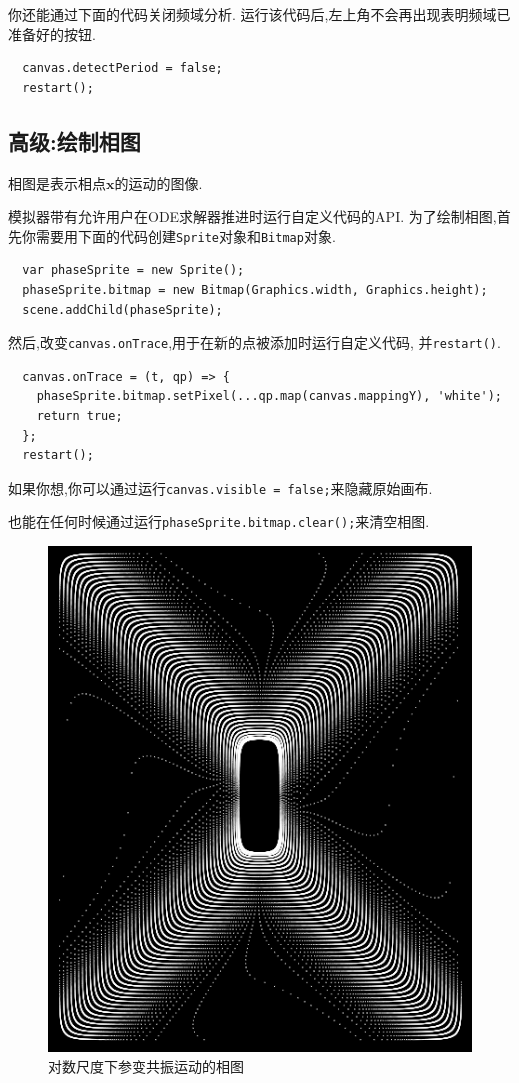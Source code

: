 \documentclass[12pt]{article}
\begin{document}
你还能通过下面的代码关闭频域分析.
运行该代码后,左上角不会再出现表明频域已准备好的按钮.

\begin{verbatim}
  canvas.detectPeriod = false;
  restart();
\end{verbatim}

\subsection{高级:绘制相图}

相图是表示相点$\mathbf x$的运动的图像\cite[p. 146]{landau1976mechanics}\cite[p. 68]{arnold1989mathmech}.

模拟器带有允许用户在ODE求解器推进时运行自定义代码的API.
为了绘制相图,首先你需要用下面的代码创建\texttt{Sprite}对象和\texttt{Bitmap}对象.

\begin{verbatim}
  var phaseSprite = new Sprite();
  phaseSprite.bitmap = new Bitmap(Graphics.width, Graphics.height);
  scene.addChild(phaseSprite);
\end{verbatim}

然后,改变\texttt{canvas.onTrace},用于在新的点被添加时运行自定义代码,
并\texttt{restart()}.

\begin{verbatim}
  canvas.onTrace = (t, qp) => {
    phaseSprite.bitmap.setPixel(...qp.map(canvas.mappingY), 'white');
    return true;
  };
  restart();
\end{verbatim}

如果你想,你可以通过运行\texttt{canvas.visible = false;}来隐藏原始画布.

也能在任何时候通过运行\texttt{phaseSprite.bitmap.clear();}来清空相图.

\begin{figure}
  \centering
  \includegraphics[width=0.3\linewidth]{parametric_resonance_logarithmic_phase.png}
  \caption{对数尺度下参变共振运动的相图}
  \label{fig:parametric_phase}
\end{figure}
\end{document}
